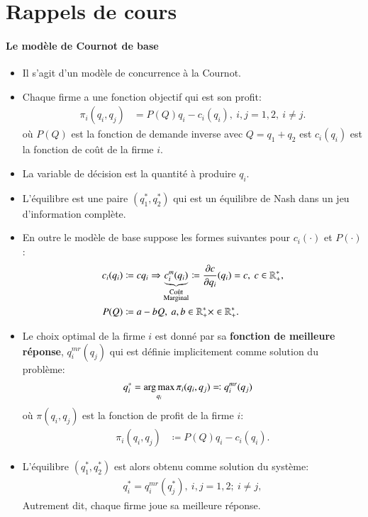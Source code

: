 \documentclass[notes, ignorenonframetext, compress, 9pt, xcolor=svgnames, aspectratio=169]{beamer}
\begin{document}
\section{Rappels de cours}
\frame{\sectionpage}
\begin{frame}
[allowframebreaks]{\insertsection}
\framesubtitle{Le modèle de Cournot de base \\}
\begin{itemize}
    \item Il s'agit d'un modèle de concurrence à la Cournot. 
        \item Chaque firme a une fonction objectif qui est son profit: 
        \begin{align*}
            \pi_i(q_i, q_j) &= P(Q)q_i -c_i(q_i),  \ i, j= 1, 2, \ i\neq j.
        \end{align*}
        où $P(Q)$ est la fonction de demande inverse avec $Q = q_1 + q_2$ est $c_i(q_i)$ 
        est la fonction de coût de la firme $i$.
        \item La variable de décision est la quantité à produire $q_i$. 
        \item L'équilibre est une paire $(q_1^*, q_2^*)$ qui est un équilibre de Nash dans un jeu d'information complète.
        \item En outre le modèle de base suppose les formes suivantes pour $c_i(\cdot)$ et $P(\cdot)$:
        \begin{align*}
        c_i(q_i) &\coloneqq cq_i \Rightarrow  \underbrace{c^m_i(q_i)}_{\substack{\text{Coût}\\ \text{Marginal}}} \coloneqq\frac{\partial c}{\partial q_i}(q_i) = c, \ c\in\R_{+}^*, \\
        P(Q) &\coloneqq a - bQ, \ a, b  \in\R_{+}^*\times \in\R_{+}^*.
        \end{align*}
        
        \item  Le choix optimal de la firme $i$ est donné par sa \textbf{fonction de meilleure réponse}, $q_i^{mr}(q_j)$  qui est définie implicitement comme solution du problème:
        \begin{align*}
        q_i^* &= \argmax_{q_i}\pi_i(q_i, q_j) \eqqcolon q_i^{mr}(q_j) 
        \end{align*}
        où $\pi(q_i, q_j)$ est la fonction de profit de la firme $i$:
        \begin{align*}
        \pi_i(q_i, q_j) &\coloneqq P(Q) q_i - c_i(q_i).
        \end{align*}
        \item  L'équilibre  $(q_1^*, q_2^*)$ est alors obtenu comme solution du système:
       \begin{align*}
       q_i^* =  q_i^{mr}(q_j^*),  \ i, j = 1, 2; \ i\neq j,
       \end{align*}
       Autrement dit, chaque firme joue sa meilleure réponse.
        

\end{itemize}
\end{frame}
\end{document}
